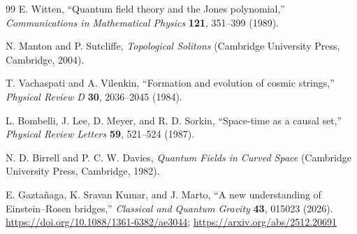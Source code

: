 \documentclass[11pt]{article}
\begin{document}
\begin{thebibliography}{99}
E. Witten,
``Quantum field theory and the Jones polynomial,''
\textit{Communications in Mathematical Physics} \textbf{121}, 351--399 (1989).

N. Manton and P. Sutcliffe,
\textit{Topological Solitons}
(Cambridge University Press, Cambridge, 2004).

T. Vachaspati and A. Vilenkin,
``Formation and evolution of cosmic strings,''
\textit{Physical Review D} \textbf{30}, 2036--2045 (1984).

L. Bombelli, J. Lee, D. Meyer, and R. D. Sorkin,
``Space-time as a causal set,''
\textit{Physical Review Letters} \textbf{59}, 521--524 (1987).

N. D. Birrell and P. C. W. Davies,
\textit{Quantum Fields in Curved Space}
(Cambridge University Press, Cambridge, 1982).

E. Gazta\~naga, K. Sravan Kumar, and J. Marto,
``A new understanding of Einstein--Rosen bridges,''
\textit{Classical and Quantum Gravity} \textbf{43}, 015023 (2026).
\url{https://doi.org/10.1088/1361-6382/ae3044};
\url{https://arxiv.org/abs/2512.20691}

\end{thebibliography}
\end{document}
